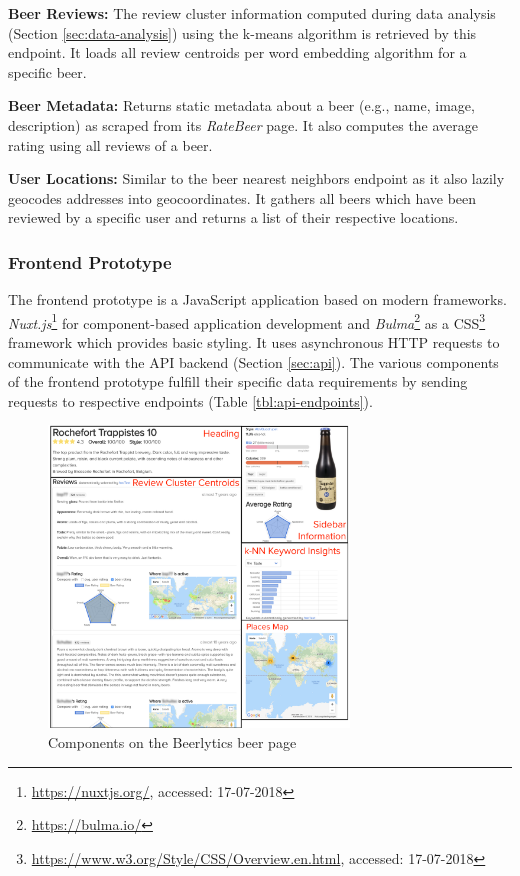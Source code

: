 \noindent
\textbf{Beer Reviews:} The review cluster information computed during data analysis (Section \ref{sec:data-analysis}) using the k-means algorithm is retrieved by this endpoint.
It loads all review centroids per word embedding algorithm for a specific beer.

\noindent
\textbf{Beer Metadata:} Returns static metadata about a beer (e.g., name, image, description) as scraped from its \textit{RateBeer} page.
It also computes the average rating using all reviews of a beer.

\noindent
\textbf{User Locations:} Similar to the beer nearest neighbors endpoint as it also lazily geocodes addresses into geocoordinates.
It gathers all beers which have been reviewed by a specific user and returns a list of their respective locations.


\subsubsection{Frontend Prototype} \label{sec:frontend-prototype}
The frontend prototype is a JavaScript application based on modern frameworks.
\textit{Nuxt.js}\footnote{\url{https://nuxtjs.org/}, accessed: 17-07-2018} for component-based application development and \textit{Bulma}\footnote{\url{https://bulma.io/}} as a CSS\footnote{\url{https://www.w3.org/Style/CSS/Overview.en.html}, accessed: 17-07-2018} framework which provides basic styling.
It uses asynchronous HTTP requests to communicate with the API backend (Section \ref{sec:api}).
The various components of the frontend prototype fulfill their specific data requirements by sending requests to respective endpoints (Table \ref{tbl:api-endpoints}).

\begin{figure}[h]
\includegraphics[width=8cm]{assets/beerlytics_components.png}
\caption{Components on the Beerlytics beer page}
\centering
\label{fig:beerlytics-components}
\end{figure}

